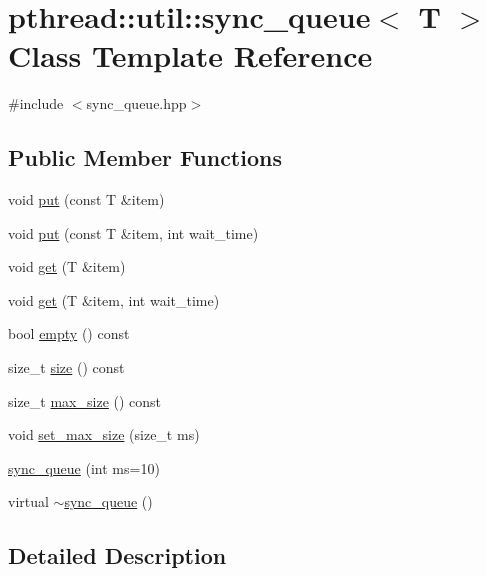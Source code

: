 \hypertarget{classpthread_1_1util_1_1sync__queue}{}\section{pthread\+:\+:util\+:\+:sync\+\_\+queue$<$ T $>$ Class Template Reference}
\label{classpthread_1_1util_1_1sync__queue}


{\ttfamily \#include $<$sync\+\_\+queue.\+hpp$>$}

\subsection*{Public Member Functions}
\begin{DoxyCompactItemize}
\item 
void \hyperlink{classpthread_1_1util_1_1sync__queue_a235265f27a6d2500ab2b56c83d703f06}{put} (const T \&item)
\item 
void \hyperlink{classpthread_1_1util_1_1sync__queue_aa507ddc9d8d86fa8d9510c3bc63a877b}{put} (const T \&item, int wait\+\_\+time)
\item 
void \hyperlink{classpthread_1_1util_1_1sync__queue_ac30ef4e626177ae47f27399ff3c8f28b}{get} (T \&item)
\item 
void \hyperlink{classpthread_1_1util_1_1sync__queue_ae5354915a1c76760924855318a11be04}{get} (T \&item, int wait\+\_\+time)
\item 
bool \hyperlink{classpthread_1_1util_1_1sync__queue_ad915d5b45a49f6f6bd09b5bdf170dd10}{empty} () const 
\item 
size\+\_\+t \hyperlink{classpthread_1_1util_1_1sync__queue_a99e07d02c268e4a7c6cab7ee5ee06274}{size} () const 
\item 
size\+\_\+t \hyperlink{classpthread_1_1util_1_1sync__queue_ae805476dd5db21e3b48b2d7ae7394305}{max\+\_\+size} () const 
\item 
void \hyperlink{classpthread_1_1util_1_1sync__queue_a5ac6e6e5d64171d63db00c60cb98f693}{set\+\_\+max\+\_\+size} (size\+\_\+t ms)
\item 
\hyperlink{classpthread_1_1util_1_1sync__queue_a2ca4ec947675b48411fda94770e80d3f}{sync\+\_\+queue} (int ms=10)
\item 
virtual \hyperlink{classpthread_1_1util_1_1sync__queue_ad2f95ba727c920fe9614f54377e32fe1}{$\sim$sync\+\_\+queue} ()
\end{DoxyCompactItemize}


\subsection{Detailed Description}

